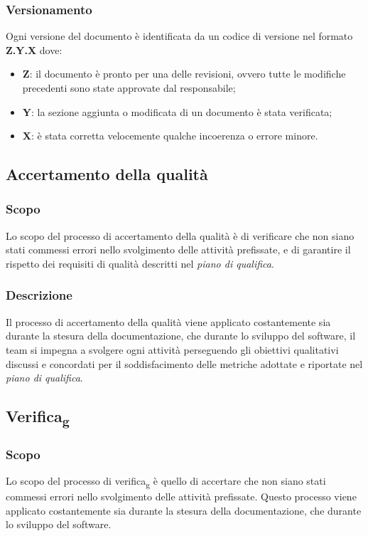         \subsubsection{Versionamento}
        Ogni versione del documento è identificata da un codice di versione nel formato \textbf{Z.Y.X} dove:
        \begin{itemize}
            \item \textbf{Z}: il documento è pronto per una delle revisioni, ovvero tutte le modifiche precedenti sono state approvate dal responsabile;
            \item \textbf{Y}: la sezione aggiunta o modificata di un documento è stata verificata;
            \item \textbf{X}: è stata corretta velocemente qualche incoerenza o errore minore.
        \end{itemize}

    \subsection{Accertamento della qualità}
    \subsubsection{Scopo}
    Lo scopo del processo di accertamento della qualità è di verificare che non siano stati commessi errori nello svolgimento delle attività prefissate, e di garantire il rispetto dei requisiti di qualità descritti nel \textit{piano di qualifica}.
    \subsubsection{Descrizione}
    Il processo di accertamento della qualità viene applicato costantemente sia durante la stesura della documentazione, che durante lo sviluppo del software, il team si impegna a svolgere ogni attività perseguendo gli obiettivi qualitativi discussi e concordati per il soddisfacimento delle metriche adottate e riportate nel \textit{piano di qualifica}.    

    \subsection{Verifica\textsubscript{g}}
        \subsubsection{Scopo}
        Lo scopo del processo di verifica\textsubscript{g} è quello di accertare che non siano stati commessi errori nello svolgimento
        delle attività prefissate. Questo processo viene applicato costantemente sia durante la stesura
        della documentazione, che durante lo sviluppo del software.
